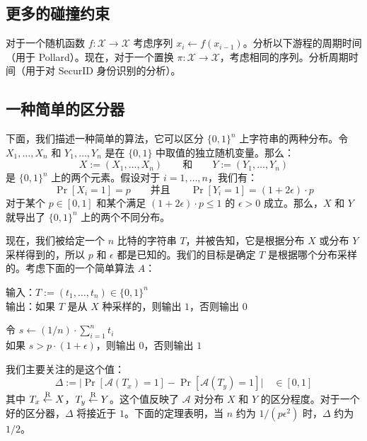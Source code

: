 \subsection{更多的碰撞约束}\label{subsec:B-1-1}

对于一个随机函数 $f:\mathcal{X}\to\mathcal{X}$ 考虑序列 $x_i\leftarrow f(x_{i-1})$。分析以下游程的周期时间（用于 Pollard）。现在，对于一个置换 $\pi:\mathcal{X}\to\mathcal{X}$，考虑相同的序列。分析周期时间（用于对 SecurID 身份识别的分析）。

\subsection{一种简单的区分器}\label{subsec:B-1-2}

下面，我们描述一种简单的算法，它可以区分 $\{0,1\}^n$ 上字符串的两种分布。令 $X_1,\dots,X_n$ 和 $Y_1,\dots,Y_n$ 是在 $\{0,1\}$ 中取值的独立随机变量。那么：
\[
X:=(X_1,\dots,X_n)
\qquad\text{和}\qquad
Y:=(Y_1,\dots,Y_n)
\]
是 $\{0,1\}^n$ 上的两个元素。假设对于 $i=1,\dots,n$，我们有：
\[
\Pr[X_i=1]=p
\qquad\text{并且}\qquad
\Pr[Y_i=1]=(1+2\epsilon)\cdot p
\]
对于某个 $p\in[0,1]$ 和某个满足 $(1+2\epsilon)\cdot p\leq 1$ 的 $\epsilon >0$ 成立。那么，$X$ 和 $Y$ 就导出了 $\{0,1\}^n$ 上的两个不同分布。

现在，我们被给定一个 $n$ 比特的字符串 $T$，并被告知，它是根据分布 $X$ 或分布 $Y$ 采样得到的，所以 $p$ 和 $\epsilon$ 都是已知的。我们的目标是确定 $T$ 是根据哪个分布采样的。考虑下面的一个简单算法 $A$：

\vspace*{10pt}

\hspace*{5pt} 输入：$T:=(t_1,\dots,t_n)\in\{0,1\}^n$\\
\hspace*{26pt} 输出：如果 $T$ 是从 $X$ 种采样的，则输出 $1$，否则输出 $0$

\vspace*{5pt}

\hspace*{5pt} 令 $s\leftarrow(1/n)\cdot\sum_{i=1}^nt_i$\\
\hspace*{26pt} 如果 $s>p\cdot(1+\epsilon)$，则输出 $0$，否则输出 $1$

\vspace*{10pt}

\noindent
我们主要关注的是这个值：
\[
\Delta:=\big\lvert
\Pr[\mathcal{A}(T_x)=1]-\Pr[\mathcal{A}(T_y)=1]
\big\rvert
\quad\in[0,1]
\]
其中 $T_x\overset{\rm R}\leftarrow X$，$T_y\overset{\rm R}\leftarrow Y$。这个值反映了 $\mathcal{A}$ 对分布 $X$ 和 $Y$ 的区分程度。对于一个好的区分器，$\Delta$ 将接近于 $1$。下面的定理表明，当 $n$ 约为 $1/(p\epsilon^2)$ 时，$\Delta$ 约为 $1/2$。

